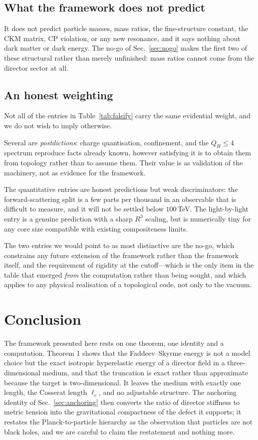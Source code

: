 \documentclass[aps,prd,preprint,nofootinbib,longbibliography]{revtex4-2}
\newcommand{\Qh}{Q_H}
\newcommand{\lc}{\ell_c}
\begin{document}
\subsection{What the framework does not predict}

It does not predict particle masses, mass ratios, the fine-structure constant,
the CKM matrix, CP violation, or any new resonance, and it says nothing about
dark matter or dark energy. The no-go of Sec.~\ref{sec:nogo} makes the first two
of these structural rather than merely unfinished: mass ratios cannot come from
the director sector at all.

\subsection{An honest weighting}

Not all of the entries in Table~\ref{tab:falsify} carry the same evidential
weight, and we do not wish to imply otherwise.

Several are \emph{postdictions}: charge quantisation, confinement, and the
$\Qh\le4$ spectrum reproduce facts already known, however satisfying it is to
obtain them from topology rather than to assume them. Their value is as
validation of the machinery, not as evidence for the framework.

The quantitative entries are honest predictions but weak discriminators: the
forward-scattering split is a few parts per thousand in an observable that is
difficult to measure, and it will not be settled below $100\,$TeV. The
light-by-light entry is a genuine prediction with a sharp $R^3$ scaling, but is
numerically tiny for any core size compatible with existing compositeness limits.

The two entries we would point to as most distinctive are the no-go, which
constrains any future extension of the framework rather than the framework
itself, and the requirement of rigidity at the cutoff---which is the only item in
the table that emerged \emph{from} the computation rather than being sought,
and which applies to any physical realisation of a topological code, not only to
the vacuum.

\section{Conclusion}

The framework presented here rests on one theorem, one identity and a
computation. Theorem 1 shows that the Faddeev--Skyrme energy is not a model
choice but the exact isotropic hyperelastic energy of a director field in a
three-dimensional medium, and that the truncation is exact rather than
approximate because the target is two-dimensional. It leaves the medium with
exactly one length, the Cosserat length $\lc$, and no adjustable structure. The
anchoring identity of Sec.~\ref{sec:anchoring} then converts the ratio of
director stiffness to metric tension into the gravitational compactness of the
defect it supports; it restates the Planck-to-particle hierarchy as the
observation that particles are not black holes, and we are careful to claim the
restatement and nothing more.
\end{document}
